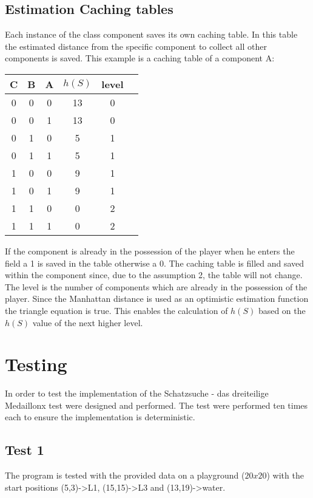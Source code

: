\documentclass{article}
\newcommand{\problem}{Schatzsuche - das dreiteilige Medaillon}
\begin{document}
\subsection{Estimation Caching tables} \label{estimation_caching_tables}
Each instance of the class component saves its own caching table. In this table the estimated distance from the specific component to collect all other components is saved. This example is a caching table of a component A:\\
\begin{center}
\begin{tabular}{ |c|c|c|c|c|c| } 
 \hline
 C & B & A & $h(S)$ & level \\ 
 \hline
 0 & 0 & 0 & 13 & 0 \\ 
 0 & 0 & 1 & 13 & 0 \\ 
 0 & 1 & 0 & 5 & 1 \\ 
 0 & 1 & 1 & 5 & 1 \\ 
 1 & 0 & 0 & 9 & 1 \\ 
 1 & 0 & 1 & 9 & 1 \\ 
 1 & 1 & 0 & 0 & 2 \\ 
 1 & 1 & 1 & 0 & 2 \\ 
 \hline
\end{tabular}
\label{tab:caching table}
\end{center}
If the component is already in the possession of the player when he enters the field a 1 is saved in the table otherwise a 0. 
The caching table is filled and saved within the component since, due to the assumption 2, the table will not change. 
The level is the number of components which are already in the possession of the player. 
Since the Manhattan distance is used as an optimistic estimation function the triangle equation is true. This enables the calculation of $h(S)$ based on the $h(S)$ value of the next higher level.


\section{Testing}
In order to test the implementation of the \problem x test were designed and performed. The test were performed ten times each to ensure the implementation is deterministic. 

\subsection{Test 1}
The program is tested with the provided data on a  playground ($20 x 20$) with the start positions (5,3)->L1, (15,15)->L3 and (13,19)->water.
\end{document}
